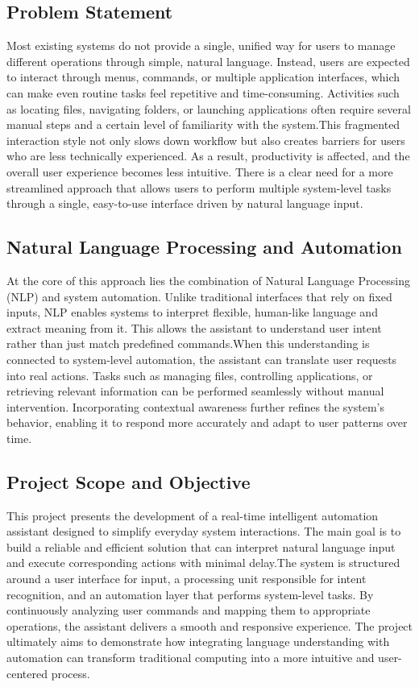 \documentclass[conference]{IEEEtran}
\begin{document}
\subsection{{Problem Statement}}
\noindent
Most existing systems do not provide a single, unified way for users to manage different operations through simple, natural language. Instead, users are expected to interact through menus, commands, or multiple application interfaces, which can make even routine tasks feel repetitive and time-consuming. Activities such as locating files, navigating folders, or launching applications often require several manual steps and a certain level of familiarity with the system.This fragmented interaction style not only slows down workflow but also creates barriers for users who are less technically experienced. As a result, productivity is affected, and the overall user experience becomes less intuitive. There is a clear need for a more streamlined approach that allows users to perform multiple system-level tasks through a single, easy-to-use interface driven by natural language input.

\subsection{Natural Language Processing and Automation}
\noindent
At the core of this approach lies the combination of Natural Language Processing (NLP) and system automation. Unlike traditional interfaces that rely on fixed inputs, NLP enables systems to interpret flexible, human-like language and extract meaning from it. This allows the assistant to understand user intent rather than just match predefined commands.When this understanding is connected to system-level automation, the assistant can translate user requests into real actions. Tasks such as managing files, controlling applications, or retrieving relevant information can be performed seamlessly without manual intervention. Incorporating contextual awareness further refines the system’s behavior, enabling it to respond more accurately and adapt to user patterns over time.

\subsection{Project Scope and Objective}
\noindent
This project presents the development of a real-time intelligent automation assistant designed to simplify everyday system interactions. The main goal is to build a reliable and efficient solution that can interpret natural language input and execute corresponding actions with minimal delay.The system is structured around a user interface for input, a processing unit responsible for intent recognition, and an automation layer that performs system-level tasks. By continuously analyzing user commands and mapping them to appropriate operations, the assistant delivers a smooth and responsive experience. The project ultimately aims to demonstrate how integrating language understanding with automation can transform traditional computing into a more intuitive and user-centered process.
\end{document}
